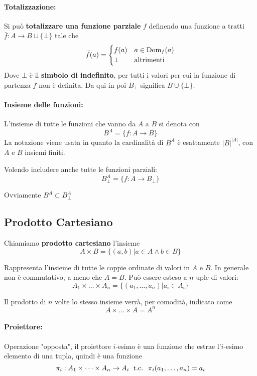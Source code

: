 \paragraph{Totalizzazione:} Si può \textbf{totalizzare una funzione parziale} $f$ definendo una funzione a tratti $\bar{f}: A \rightarrow B \cup \{\bot\}$ tale che
$$ 
\bar{f} (a) = \begin{cases}
	f(a) & a \in \text{Dom}_f(a) \\
	\bot & \text{altrimenti}
\end{cases}
$$
Dove $\bot$ è il \textbf{simbolo di indefinito}, per tutti i valori per cui la funzione di partenza $f$ non è definita. Da qui in poi $B_\bot$ significa $B \cup \{\bot\}$.

\paragraph{Insieme delle funzioni:} L'insieme di tutte le funzioni che vanno da $A$ a $B$ si denota con
$$ B^A = \{f: A \rightarrow B \} $$
La notazione viene usata in quanto la cardinalità di $B^A$ è esattamente $|B|^{|A|}$, con $A$ e $B$ insiemi finiti.

Volendo includere anche tutte le funzioni parziali: 
$$ B^A_\bot = \{f: A \rightarrow B_\bot \} $$

Ovviamente $B^{A} \subset B^{A}_{\bot}$

\subsection{Prodotto Cartesiano}

Chiamiamo \textbf{prodotto cartesiano} l'insieme
$$ A \times B = \{(a,b) | a \in A \wedge b \in B \} $$

Rappresenta l'insieme di tutte le coppie ordinate di valori in $A$ e $B$. In generale non è commutativo, a meno che $A = B$. Può essere esteso a $n$-uple di valori:
$$ A_1 \times \dots \times A_n = \{(a_1, \dots, a_n) | a_i \in A_i\} $$

Il prodotto di $n$ volte lo stesso insieme verrà, per comodità, indicato come
$$ A \times \dots \times A = A^n $$

\paragraph{Proiettore:} Operazione "opposta", il proiettore $i$-esimo è una funzione che estrae l'$i$-esimo elemento di una tupla, quindi è una funzione
$$ \pi_i: A_1 \times \dots \times A_n \rightarrow A_i \; \text{ t.c. } \; \pi_i (a_1, \dots, a_n) = a_i $$


